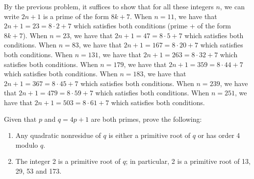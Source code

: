 \begin{solution}
    By the previous problem, it suffices to show that for all these integers $n$, we can write $2n + 1$ is a prime of the form $8k+7$. When $n = 11$, we have that $2n + 1 = 23 = 8\cdot2 + 7$ which satisfies both conditions (prime + of the form $8k+7$). When $n = 23$, we have that $2n + 1 = 47 = 8\cdot 5 + 7$ which satisfies both conditions. When $n = 83$, we have that $2n + 1 = 167 = 8\cdot 20  + 7$ which satisfies both conditions. When $n = 131$, we have that $2n + 1 = 263 = 8\cdot 32  + 7$ which satisfies both conditions. When $n = 179$, we have that $2n + 1 = 359 = 8\cdot 44  + 7$ which satisfies both conditions. When $n = 183$, we have that $2n + 1 = 367 = 8\cdot 45  + 7$ which satisfies both conditions. When $n = 239$, we have that $2n + 1 = 479 = 8\cdot 59 + 7$ which satisfies both conditions. When $n = 251$, we have that $2n + 1 = 503 = 8\cdot 61 + 7$ which satisfies both conditions. \\
\end{solution}

\begin{exercise}
    Given that $p$ and $q = 4p+1$ are both primes, prove the following:
    \begin{enumerate}
        \item Any quadratic nonresidue of $q$ is either a primitive root of $q$ or has order 4 modulo $q$. 
        \item The integer 2 is a primitive root of $q$; in particular, 2 is a primitive root of 13, 29, 53 and 173.\\
    \end{enumerate}
\end{exercise}

